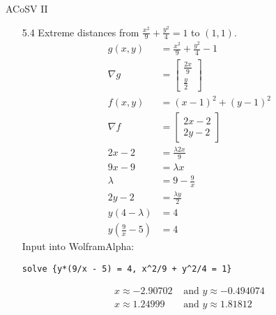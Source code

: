 \documentclass[11pt,letterpaper]{article}
\begin{document}
\noindent
ACoSV II

\begin{enumerate}
\item[5.4]
  Extreme distances from $\frac{x^2}{9}+\frac{y^2}{4}=1$ to $(1,1)$.
  \begin{align*}
    g(x,y) &= \frac{x^2}{9}+\frac{y^2}{4}-1 \\
    \nabla g &= \begin{bmatrix}
                  \frac{2x}{9} \\[0.3em]
                  \frac{y}{2}
                \end{bmatrix} \\
    f(x,y) &= (x-1)^2+(y-1)^2 \tag{dist$^2$ maximizes dist} \\
    \nabla f &= \begin{bmatrix}
                  2x-2 \\
                  2y-2
                \end{bmatrix} \\
    2x-2 &= \frac{\lambda 2x}{9} \tag{$\nabla f = \lambda\nabla g$} \\
    9x-9 &= \lambda x \\
    \lambda &= 9-\frac{9}{x} \\
    2y-2 &= \frac{\lambda y}{2} \tag{$\nabla f = \lambda\nabla g$} \\
    y(4-\lambda) &= 4 \\
    y\left(\frac{9}{x}-5\right) &= 4
  \end{align*}
  Input into WolframAlpha:
\begin{verbatim}
solve {y*(9/x - 5) = 4, x^2/9 + y^2/4 = 1}
\end{verbatim}
  \begin{align*}
    x \approx -2.90702 &\text{ and } y \approx -0.494074 \tag{max} \\
    x \approx 1.24999 &\text{ and } y \approx 1.81812 \tag{min}
  \end{align*}


\end{enumerate}
\end{document}
